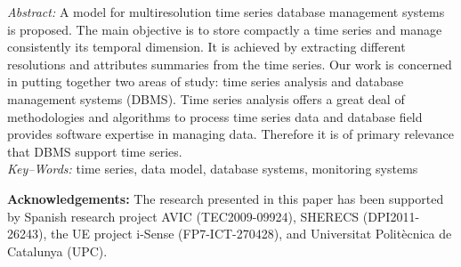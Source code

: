 \documentclass[twocolumn,11pt,a4paper]{article}
\begin{document}
{\begin{minipage}[b]{6.9in}
\baselineskip 12.5pt {\it Abstract:}
A model for multiresolution time series database management systems is
proposed. The main objective is to store compactly a time series and
manage consistently its temporal dimension. It is achieved by
extracting different resolutions and attributes summaries from the
time series.
%
Our work is concerned in putting together two areas of study: time
series analysis and database management systems (DBMS). Time series analysis
offers a great deal of methodologies and algorithms to process time
series data and database field provides software expertise in managing
data. Therefore it is of primary relevance that DBMS support time series.
%
\\ [4mm] {\it Key--Words:}
time series, data model, database systems, monitoring systems
\end{minipage}
\vspace{-10pt}}

\maketitle

\thispagestyle{empty} \pagestyle{empty}
%
%















\vspace{10pt} \noindent
{\bf Acknowledgements:}  The research presented in this paper has been supported by Spanish research project  AVIC ({\small TEC2009-09924}), SHERECS ({\small DPI2011-26243}), the UE project i-Sense ({\small FP7-ICT-270428}), and Universitat Polit\`{e}cnica de Catalunya (UPC).


\printbibliography{}



\end{document}
